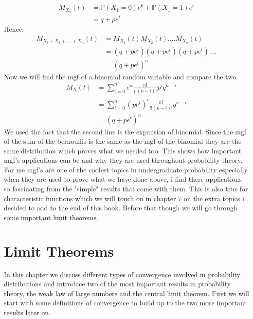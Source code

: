 \documentclass[,oneside]{article}
\begin{document}
\begin{enumerate}
\begin{align*}
M_{X_1}(t) &= \mathbb{P}(X_1 = 0)e^0 + \mathbb{P}(X_1 = 1) e^t\\
&=q+pe^t
\end{align*}
Hence:
\begin{align*}
M_{X_1+X_2+....+X_n}(t)&=M_{X_1}(t)M_{X_2}(t)....M_{X_n}(t)\\
&=(q+pe^t)(q+pe^t)(q+pe^t)....\\
&=(q+pe^t)^n
\end{align*}
Now we will find the mgf of a binomial random variable and compare the two.
\begin{align*}
M_X(t)&= \sum_{i=0}^{n} e^{it}\frac{n!}{i!(n-i)!}p^i q^{n-i}\\
&= \sum_{i=0}^{n} (pe^t)^{i}\frac{n!}{i!(n-i)!} q^{n-i}\\
&= (q+pe^t)^n
\end{align*}
We used the fact that the second line is the expansion of binomial. Since the mgf of the sum of the bernoullis is the same as the mgf of the binomial they are the same distribution which proves what we needed too. This shows how important mgf's applications can be and why they are used throughout probability theory. For me mgf's are one of the coolest topics in undergraduate probability especially when they are used to prove what we have done above, i find there applications so fascinating from the "simple" results that come with them. This is also true for characteristic functions which we will touch on in chapter 7 on the extra topics i decided to add to the end of this book. Before that though we will go through some important limit theorems.
\pagebreak
\section{Limit Theorems}
In this chapter we discuss different types of convergence involved in probability distributions and introduce two of the most important results in probability theory, the weak law of large numbers and the central limit theorem. First we will start with some definitions of convergence to build up to the two more important results later on.

\end{enumerate}
\end{document}
